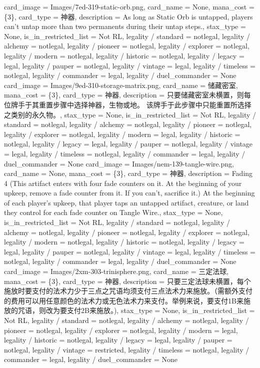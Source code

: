 \documentclass[lang = cn, color = black, 10pt]{AllThatStax}
\begin{document}
\card
{
	card_image = Images/7ed-319-static-orb.png,
	card_name = None,
	mana_cost = \{3\},
	card_type = 神器,
	description = As long as Static Orb is untapped, players can't untap more than two permanents during their untap steps.,
	stax_type = None,
	is_in_restricted_list = Not RL,
	legality / standard = notlegal,
	legality / alchemy = notlegal,
	legality / pioneer = notlegal,
	legality / explorer = notlegal,
	legality / modern = notlegal,
	legality / historic = notlegal,
	legality / legacy = legal,
	legality / pauper = notlegal,
	legality / vintage = legal,
	legality / timeless = notlegal,
	legality / commander = legal,
	legality / duel_commander = None
}
\card
{
	card_image = Images/9ed-310-storage-matrix.png,
	card_name = 储藏密室,
	mana_cost = \{3\},
	card_type = 神器,
	description = 只要储藏密室未横置，则每位牌手于其重置步骤中选择神器，生物或地。 该牌手于此步骤中只能重置所选择之类别的永久物。,
	stax_type = None,
	is_in_restricted_list = Not RL,
	legality / standard = notlegal,
	legality / alchemy = notlegal,
	legality / pioneer = notlegal,
	legality / explorer = notlegal,
	legality / modern = legal,
	legality / historic = notlegal,
	legality / legacy = legal,
	legality / pauper = notlegal,
	legality / vintage = legal,
	legality / timeless = notlegal,
	legality / commander = legal,
	legality / duel_commander = None
}
\card
{
	card_image = Images/nem-139-tangle-wire.png,
	card_name = None,
	mana_cost = \{3\},
	card_type = 神器,
	description = Fading 4 (This artifact enters with four fade counters on it. At the beginning of your upkeep, remove a fade counter from it. If you can't, sacrifice it.)
	At the beginning of each player's upkeep, that player taps an untapped artifact, creature, or land they control for each fade counter on Tangle Wire.,
	stax_type = None,
	is_in_restricted_list = Not RL,
	legality / standard = notlegal,
	legality / alchemy = notlegal,
	legality / pioneer = notlegal,
	legality / explorer = notlegal,
	legality / modern = notlegal,
	legality / historic = notlegal,
	legality / legacy = legal,
	legality / pauper = notlegal,
	legality / vintage = legal,
	legality / timeless = notlegal,
	legality / commander = legal,
	legality / duel_commander = None
}
\card
{
	card_image = Images/2xm-303-trinisphere.png,
	card_name = 三定法球,
	mana_cost = \{3\},
	card_type = 神器,
	description = 只要三定法球未横置，每个施放时要支付的法术力少于三点之咒语均须支付三点法术力来施放。（需额外支付的费用可以用任意颜色的法术力或无色法术力来支付。举例来说，要支付{1}{B}来施放的咒语，则改为要支付{2}{B}来施放。),
	stax_type = None,
	is_in_restricted_list = Not RL,
	legality / standard = notlegal,
	legality / alchemy = notlegal,
	legality / pioneer = notlegal,
	legality / explorer = notlegal,
	legality / modern = legal,
	legality / historic = notlegal,
	legality / legacy = legal,
	legality / pauper = notlegal,
	legality / vintage = restricted,
	legality / timeless = notlegal,
	legality / commander = legal,
	legality / duel_commander = None
}
\end{document}
